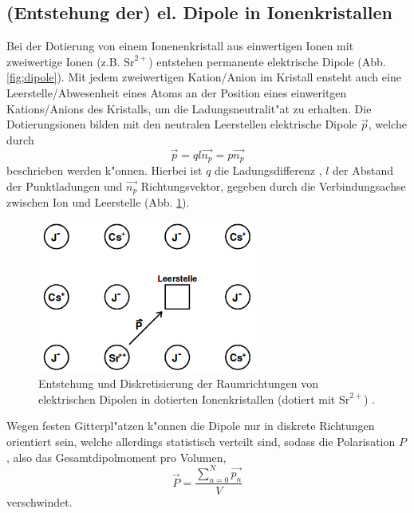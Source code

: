   \subsection{(Entstehung der) el. Dipole in Ionenkristallen}
    Bei der Dotierung von einem Ionenenkristall aus einwertigen Ionen mit zweiwertige Ionen (z.B. $\text{Sr}^{2+}$) entstehen permanente elektrische Dipole (Abb. \ref{fig;dipole}).
    Mit jedem zweiwertigen Kation/Anion im Kristall ensteht auch eine Leerstelle/Abwesenheit eines Atoms an der Position eines einweritgen Kations/Anions des Kristalls, um die Ladungsneutralit"at zu erhalten.
    Die Dotierungsionen bilden mit den neutralen Leerstellen elektrische Dipole $\vec{p}$, welche durch
    \begin{equation}
      \vec{p}=ql\vec{n_p}=p\vec{n_p}
      \label{dipol}
    \end{equation}
    beschrieben werden k"onnen.
    Hierbei ist $q$ die Ladungsdifferenz , $l$ der Abstand der Punktladungen und $\vec{n_p}$ Richtungsvektor, gegeben durch die Verbindungsachse zwischen Ion und Leerstelle (Abb. \ref{fig:dipole}).
    \begin{figure}[H]
      \centering
      \includegraphics[height=5cm]{bilder/Dipole.png}
      \caption{Entstehung und Diskretisierung der Raumrichtungen von elektrischen Dipolen in dotierten Ionenkristallen (dotiert mit $\text{Sr}^{2+}$) \cite{Anleitung}.}
      \label{fig:dipole}
    \end{figure}
    Wegen festen Gitterpl"atzen k"onnen die Dipole nur in diskrete Richtungen orientiert sein, welche allerdings statistisch verteilt sind, sodass die Polarisation $P$, also das Gesamtdipolmoment pro Volumen,
    \begin{equation}
      \vec{P}=\frac{\sum\nolimits_{n=0}^N \vec{p_n}}{V}
      \label{polarisation}
    \end{equation}
    verschwindet.

